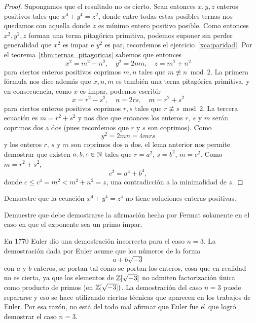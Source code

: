 \begin{proof}
	Supongamos que el resultado no es cierto. Sean entonces	$x,y,z$ enteros
	positivos tales que $x^4+y^4=z^2$, donde entre todas estas posibles ternas
	nos quedamos con aquella donde $z$ es mínimo entero positivo posible. Como
	entonces $x^2,y^2,z$ forman una terna pitagórica primitiva, podemos suponer
	sin perder generalidad que $x^2$ es impar e $y^2$ es par, recordemos el
	ejercicio~\ref{xca:paridad}. Por el teorema~\ref{thm:ternas_pitagoricas}
	sabemos que entonces
	\[
		x^2=m^2-n^2,\quad
		y^2=2mn,\quad
		z=m^2+n^2
	\]
	para ciertos enteros positivos coprimos $m,n$ tales que $m\not\equiv n\bmod
	2$. La primera fórmula nos dice además que $x,n,m$ es también una terna
	pitagórica primitiva, y en consecuencia, como $x$ es impar, podemos
	escribir
	\[
		x=r^2-s^2,\quad
		n=2rs,\quad
		m=r^2+s^2
	\]
	para ciertos enteros positivos coprimos $r,s$ tales que $r\not\equiv s\bmod
	2$. La tercera ecuación es $m=r^2+s^2$ y nos dice que entonces los enteros
	$r$, $s$ y $m$ serán coprimos dos a dos (pues recordemos que $r$ y $s$ son
	coprimos). Como
	\[
		y^2=2mn=4mrs
	\]
	y los enteros $r$, $s$ y $m$ son coprimos dos a dos, el lema anterior nos
	permite demostrar que existen $a,b,c\in\mathbb{N}$ tales que $r=a^2$, $s=b^2$,
	$m=c^2$. Como $m=r^2+s^2$, 
	\[
		c^2=a^4+b^4,
	\]
	donde $c\leq c^4=m^2< m^2+n^2=z$, una contradicción a la minimalidad de
	$z$.
\end{proof}

\begin{exercise}
	Demuestre que la ecuación $x^4+y^4=z^4$ no tiene soluciones enteras
	positivas.
\end{exercise}


\begin{exercise}
	Demuestre que debe demostrarse la afirmación hecha por Fermat solamente en
	el caso en que el exponente sea un primo impar.
\end{exercise}

En 1770 Euler dio una demostración incorrecta para el caso $n=3$. La
demostración dada por Euler asume que los números de la forma
\[
	a+b\sqrt{-3}
\]
con $a$ y $b$ enteros, se portan tal como se portan los enteros, cosa que en
realidad no es cierta, ya que los elementos de $\mathbb{Z}[\sqrt{-3}]$ no admiten
factorización única como producto de primos (en $\mathbb{Z}[\sqrt{-3}])$. La
demostración del caso $n=3$ puede repararse y eso se hace utilizando ciertas
técnicas que aparecen en los trabajos de Euler. Por esa razón, no está del todo
mal afirmar que Euler fue el que logró demostrar el caso $n=3$. 


